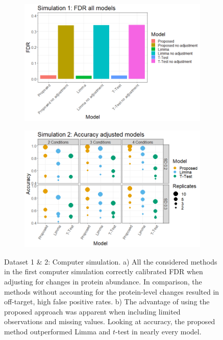 \documentclass[mcp]{article}
\numberwithin{table}{section}
\begin{document}
\begin{figure}[ht]
\centering
\begin{subfigure}[c]{0.825\linewidth}
\includegraphics[width=1\textwidth]{images/sim1_FDR_all_models.png}
\caption{}
\label{fig:sim1_fdr}
\end{subfigure}
\begin{subfigure}[c]{0.825\linewidth}
\includegraphics[width=1\textwidth]{images/sim3_Accuracy.png}
\caption{}
\label{fig:sim2_acc}
\end{subfigure}
\caption{Dataset 1 \& 2: Computer simulation. a) All the considered methods in the first computer simulation correctly calibrated FDR when adjusting for changes in protein abundance. In comparison, the methods without accounting for the protein-level changes resulted in off-target, high false positive rates. b) The advantage of using the proposed approach was apparent when including limited observations and missing values. Looking at accuracy, the proposed method outperformed Limma and $t$-test in nearly every model.
}
\label{fig:computer_sim}
\end{figure}
\end{document}
